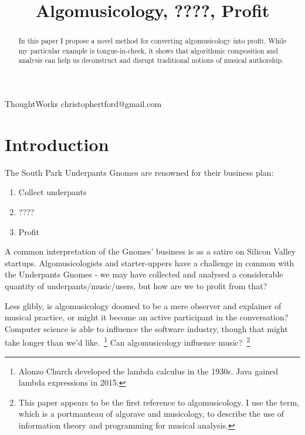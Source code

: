 \documentclass[numbers]{sigplanconf}
\begin{document}
\setlength{\pdfpageheight}{\paperheight}
\setlength{\pdfpagewidth}{\paperwidth}




\title{Algomusicology, ????, Profit}

           {ThoughtWorks}
           {christophertford@gmail.com}

\maketitle

\begin{abstract}
In this paper I propose a novel method for converting algomusicology into profit. While my particular example
is tongue-in-cheek, it shows that algorithmic composition and analysis can help us deconstruct and disrupt
traditional notions of musical authorship.
\end{abstract}



\section{Introduction}

The South Park Underpants Gnomes\cite{Gnomes} are renowned for their business plan:
\begin{enumerate}
    \item Collect underpants
    \item ????
    \item Profit
\end{enumerate}

A common interpretation of the Gnomes' business is as a satire on Silicon Valley startups.
Algomusicologists and starter-uppers have a challenge in common with the Underpants Gnomes
- we may have collected and analysed a considerable quantity of underpants/music/users, but how are we to profit from that?

Less glibly, is algomusicology doomed to be a mere observer and explainer of musical practice, or might it become an
active participant in the conversation? Computer science is able to influence the software industry, though that might take longer
than we'd like.~\footnote{Alonzo Church developed the lambda calculus in the 1930s. Java gained lambda expressions in 2015.}
Can algomusicology influence music?~\footnote{This paper appears to be the first reference to algomusicology. I use the term,
which is a portmanteau of algorave and musicology, to describe the use of information theory and programming for musical analysis.}
\end{document}
